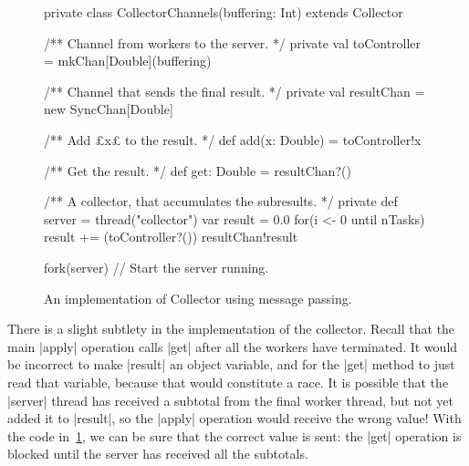\begin{figure}
\begin{scala}
  private class CollectorChannels(buffering: Int) extends Collector{
    /** Channel from workers to the server. */
    private val toController = mkChan[Double](buffering)

    /** Channel that sends the final result. */
    private val resultChan = new SyncChan[Double]

    /** Add £x£ to the result. */
    def add(x: Double) = toController!x

    /** Get the result. */
    def get: Double = resultChan?()
    
    /** A collector, that accumulates the subresults. */
    private def server = thread("collector"){
      var result = 0.0
      for(i <- 0 until nTasks) result += (toController?())
      resultChan!result
    }

    fork(server)    // Start the server running.
  }
\end{scala}
\caption{An implementation of {\scalashape Collector} using message passing.}
\label{fig:collector}
\end{figure}



There is a slight subtlety in the implementation of the collector.  Recall
that the main |apply| operation calls |get| after all the workers have
terminated.  It would be incorrect to make |result| an object variable, and
for the |get| method to just read that variable, because that would constitute
a race.  It is possible that the |server| thread has received a subtotal
from the final worker thread, but not yet added it to |result|, so the |apply|
operation would receive the wrong value!  With the code
in~\ref{fig:collector}, we can be sure that the correct value is sent: the
|get| operation is blocked until the server has received all the subtotals.


